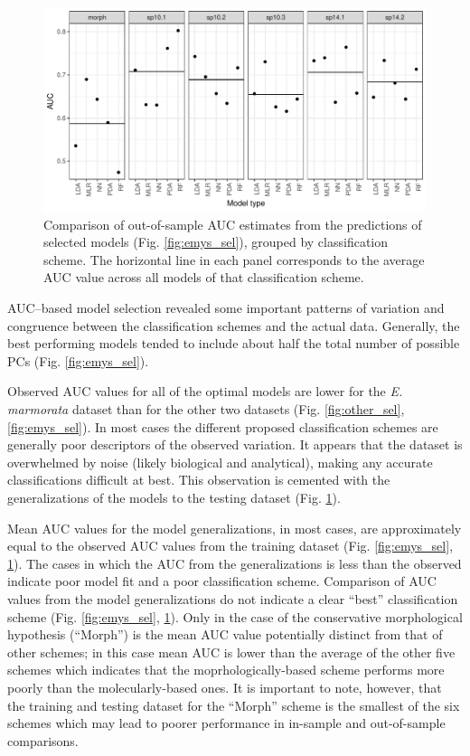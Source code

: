 \documentclass[10pt,letterpaper]{article}
\begin{document}
\afterpage{\clearpage}
\begin{figure}[ht]
  \centering
  \includegraphics[height = \textheight, width = \textwidth, keepaspectratio = true]{figure/emys_oos_sel}
  \caption{Comparison of out-of-sample AUC estimates from the predictions of selected models (Fig. \ref{fig:emys_sel}), grouped by classification scheme. The horizontal line in each panel corresponds to the average AUC value across all models of that classification scheme.}
  \label{fig:emys_oos}
\end{figure}

AUC--based model selection revealed some important patterns of variation and congruence between the classification schemes and the actual data. Generally, the best performing models tended to include about half the total number of possible PCs (Fig. \ref{fig:emys_sel}). 

Observed AUC values for all of the optimal models are lower for the \textit{E. marmorata} dataset than for the other two datasets (Fig. \ref{fig:other_sel}, \ref{fig:emys_sel}). In most cases the different proposed classification schemes are generally poor descriptors of the observed variation. It appears that the dataset is overwhelmed by noise (likely biological and analytical), making any accurate classifications difficult at best. This observation is cemented with the generalizations of the models to the testing dataset (Fig. \ref{fig:emys_oos}).

Mean AUC values for the model generalizations, in most cases, are approximately equal to the observed AUC values from the training dataset (Fig. \ref{fig:emys_sel}, \ref{fig:emys_oos}). The  cases in which the AUC from the  generalizations is less than the observed indicate poor model fit and a poor classification scheme. Comparison of AUC values from the model generalizations do not indicate a clear ``best'' classification scheme (Fig. \ref{fig:emys_sel}, \ref{fig:emys_oos}). Only in the case of the conservative morphological hypothesis (``Morph'') is the mean AUC value potentially distinct from that of other schemes; in this case mean AUC is lower than the average of the other five schemes which indicates that the moprhologically-based scheme performs more poorly than the molecularly-based ones. It is important to note, however, that the training and testing dataset for the ``Morph'' scheme is the smallest of the six schemes which may lead to poorer performance in in-sample and out-of-sample comparisons.
\end{document}
